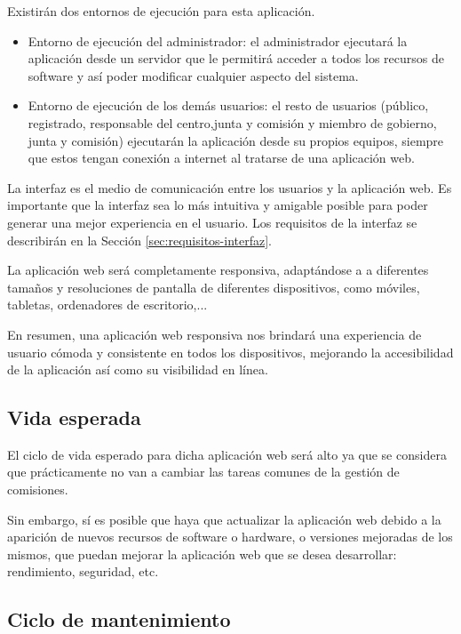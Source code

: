 Existirán dos entornos de ejecución para esta aplicación. 

 \begin{itemize}
     \item Entorno de ejecución del administrador:
         el administrador ejecutará la aplicación desde un servidor que le permitirá acceder a todos los recursos de software y así poder modificar cualquier aspecto del sistema.
     \item Entorno de ejecución de los demás usuarios:
         el resto de usuarios (público, registrado, responsable del centro,junta y comisión y miembro de gobierno, junta y comisión) ejecutarán la aplicación desde su propios equipos, siempre que estos tengan conexión a internet al tratarse de una aplicación web.
 \end{itemize}

 La interfaz es el medio de comunicación entre los usuarios y la aplicación web. Es importante que la interfaz sea lo más intuitiva y amigable posible para poder generar una mejor experiencia en el usuario. Los requisitos de la interfaz se describirán en la Sección \ref{sec:requisitos-interfaz}.

 La aplicación web será completamente responsiva, adaptándose a a diferentes tamaños y resoluciones de pantalla de diferentes dispositivos, como móviles, tabletas, ordenadores de escritorio,...

En resumen, una aplicación web responsiva nos brindará una experiencia de usuario cómoda y consistente en todos los dispositivos, mejorando la accesibilidad de la aplicación así como su visibilidad en línea.

        
\subsection{Vida esperada}
    
    El ciclo de vida esperado para dicha aplicación web será alto ya que se considera que prácticamente no van a cambiar las tareas comunes de la gestión de comisiones.
    
    Sin embargo, sí es posible que haya que actualizar la aplicación web debido a la aparición de nuevos recursos de software o hardware, o versiones mejoradas de los mismos, que puedan mejorar la aplicación web que se desea desarrollar: rendimiento, seguridad, etc.
    
\subsection{Ciclo de mantenimiento} \label{subsec:ciclo_mantenimiento}

